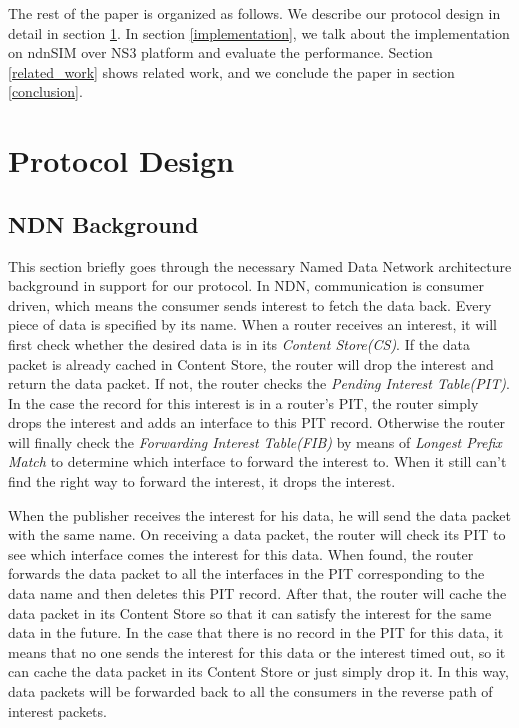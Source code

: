 \documentclass[conference]{IEEEtran}
\begin{document}
The rest of the paper is organized as follows. We describe our protocol design in detail in section \ref{design}. In section \ref{implementation}, we talk about the implementation on ndnSIM over NS3 platform and evaluate the performance. Section \ref{related_work} shows related work, and we conclude the paper in section \ref{conclusion}.

\section{Protocol Design}
\label{design}
\subsection{NDN Background}
This section briefly goes through the necessary Named Data Network architecture background in support for our protocol. In NDN, communication is consumer driven, which means the consumer sends interest to fetch the data back. Every piece of data is specified by its name. When a router receives an interest, it will first check whether the desired data is in its \emph{Content Store(CS)}. If the data packet is already cached in Content Store, the router will drop the interest and return the data packet. If not, the router checks the \emph{Pending Interest Table(PIT)}. In the case the record for this interest is in a router's PIT, the router simply drops the interest and adds an interface to this PIT record. Otherwise the router will finally check the \emph{Forwarding Interest Table(FIB)} by means of \emph{Longest Prefix Match} to determine which interface to forward the interest to. When it still can't find the right way to forward the interest, it drops the interest.

When the publisher receives the interest for his data, he will send the data packet with the same name. On receiving a data packet, the router will check its PIT to see which interface comes the interest for this data. When found, the router forwards the data packet to all the interfaces in the PIT corresponding to the data name and then deletes this PIT record. After that, the router will cache the data packet in its Content Store so that it can satisfy the interest for the same data in the future. In the case that there is no record in the PIT for this data, it means that no one sends the interest for this data or the interest timed out, so it can cache the data packet in its Content Store or just simply drop it. In this way, data packets will be forwarded back to all the consumers in the reverse path of interest packets.
\end{document}
